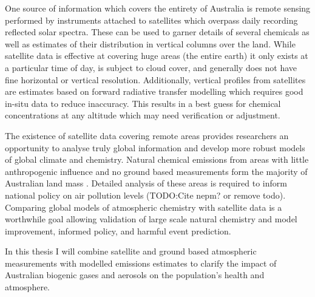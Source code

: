 One source of information which covers the entirety of Australia is remote sensing performed by instruments attached to satellites which overpass daily recording reflected solar spectra.
These can be used to garner details of several chemicals as well as estimates of their distribution in vertical columns over the land.
While satellite data is effective at covering huge areas (the entire earth) it only exists at a particular time of day, is subject to cloud cover, and generally does not have fine horizontal or vertical resolution.
Additionally, vertical profiles from satellites are estimates based on forward radiative transfer modelling which requires good in-situ data to reduce inaccuracy.
This results in a best guess for chemical concentrations at any altitude which may need verification or adjustment.

The existence of satellite data covering remote areas provides researchers an opportunity to analyse truly global information and develop more robust models of global climate and chemistry.
Natural chemical emissions from areas with little anthropogenic influence and no ground based measurements form the majority of Australian land mass \cite{VanDerA_2008}.
Detailed analysis of these areas is required to inform national policy on air pollution levels (TODO:Cite nepm? or remove todo).
Comparing global models of atmospheric chemistry with satellite data is a worthwhile goal allowing validation of large scale natural chemistry and model improvement, informed policy, and harmful event prediction.

In this thesis I will combine satellite and ground based atmospheric measurements with modelled emissions estimates to clarify the impact of Australian biogenic gases and aerosols on the population's health and atmosphere.